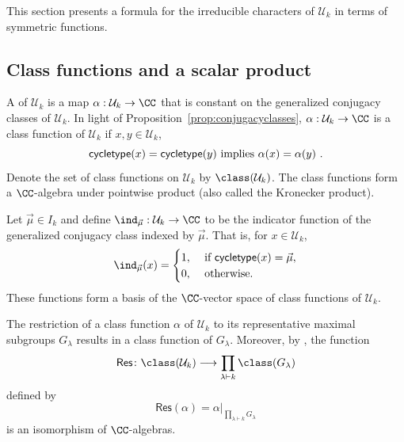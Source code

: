 This section presents a formula for the irreducible characters of $\mathcal{U}_k$ in terms of symmetric functions.

\subsection{Class functions and a scalar product} \label{subsec:classfunctions}

A  of $\mathcal{U}_k$ is a map $\alpha: \mathcal{U}_k \to
\CC$ that is constant on the generalized conjugacy classes of $\mathcal{U}_k$.
In light of Proposition~\ref{prop:conjugacyclasses},
$\alpha: \mathcal{U}_k \to \CC$ is a class function of $\mathcal{U}_k$ if
$x, y \in \mathcal{U}_k$,
$$\mathsf{cycletype}(x) = \mathsf{cycletype}(y)\hbox{ implies }\alpha(x) = \alpha(y)~.$$
Denote the set of class functions on $\mathcal{U}_k$ by
$\class({\mathcal{U}_k})$.  The class functions form a $\CC$-algebra
under pointwise product (also called the Kronecker product).

Let $\vec{\mu} \in I_k$ and define
$\ind_{\vec{\mu}} : \mathcal{U}_k \rightarrow \CC$ to be the
indicator function of the generalized conjugacy class indexed by
$\vec{\mu}$.  That is, for $x \in \mathcal{U}_k$,
\begin{equation}\label{eq:indicator}
    \ind_{\vec{\mu}}(x) = \begin{cases}1,&\hbox{ if }\mathsf{cycletype}(x)=\vec{\mu},\\
    0,&\hbox{ otherwise.}\end{cases}
\end{equation}
These functions form a
basis of the $\CC$-vector space of class functions of $\mathcal{U}_k$.

The restriction of a class function $\alpha$ of $\mathcal{U}_k$ to its
representative maximal subgroups $G_\lambda$ results in a class function of
$G_\lambda$. Moreover, by \cite[Proposition 7.5 and Proposition 7.6]{Steinberg.2016},
the function
\begin{equation}\label{restrictionmap}
    \mathsf{Res} \colon \class(\mathcal{U}_k) \longrightarrow \prod_{\lambda \vdash k} \class(G_{\lambda})
\end{equation}
defined by
$$\mathsf{Res}(\alpha) = \alpha|_{\prod_{\lambda \vdash k} G_{\lambda}}$$
is an isomorphism of $\CC$-algebras.

